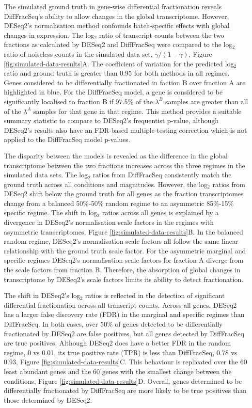 \documentclass[../main.tex]{subfiles}
\begin{document}
The simulated ground truth in gene-wise differential fractionation reveals DiffFracSeq's ability to allow changes in the global transcriptome.
However, DESeq2's normalisation method confounds batch-specific effects with global changes in expression.
The log$_2$ ratio of transcript counts between the two fractions as calculated by DESeq2 and DiffFracSeq were compared to the log$_2$ ratio of noiseless counts in the simulated data set, $\gamma/(1-\gamma)$, Figure \ref{fig:simulated-data-results}A.
The coefficient of variation for the predicted log$_2$ ratio and ground truth is greater than 0.95 for both methods in all regimes. 
Genes considered to be differentially fractionated in faction B over fraction A are highlighted in blue.
For the DiffFracSeq model, a gene is considered to be significantly localised to fraction B if 97.5\% of the $\lambda^{B}$ samples are greater than all of the $\lambda^{A}$ samples for that gene in that regime.
This method provides a suitable summary statistic to compare to DESeq2's frequentist p-value, although DESeq2's results also have an FDR-based multiple-testing correction which is not applied to the DiffFracSeq model p-values.

The disparity between the models is revealed as the difference in the global transcriptome between the two fractions increases across the three regimes in the simulated data sets.
The log$_2$ ratios from DiffFracSeq consistently match the ground truth across all conditions and magnitudes.
However, the log$_2$ ratios from DESeq2 shift below the ground truth for all genes as the fraction transcriptomes change from a balanced 50\%-50\% random regime to an asymmetric 85\%-15\% specific regime.
The shift in log$_2$ ratios across all genes is explained by a divergence in DESeq2's normalisation scale factors in the regimes with asymmetric transcriptomes, Figure \ref{fig:simulated-data-results}B.
In the balanced random regime, DESeq2's normalisation scale factors all follow the same linear relationship with the ground truth scale factor.
For the asymmetric marginal and specific regimes DESeq2's normalisation scale factors for fraction A diverge from the scale factors from fraction B.
Therefore, the absorption of global changes in transcriptome by DESeq2's scale factors limits its ability to detect fractionation.

The shift in DESeq2's log$_2$ ratios is reflected in the detection of significant differential fractionation across all transcript counts.
Across all genes, DESeq2 has a larger false discovery rate (FDR) in the marginal and specific regimes than DiffFracSeq.
In both cases, over 50\% of genes detected to be differentially fractionated by DESeq2 are false positives, but all genes detected by DiffFracSeq are true positives.
Although DESeq2 does have a better FDR in the random regime, 0 vs 0.01, its true positive rate (TPR) is less than DiffFracSeq, 0.78 vs 0.93, Figure \ref{fig:simulated-data-results}C.
This behaviour is replicated over the 60 least abundant genes and the 60 genes with the smallest change between the conditions, Figure \ref{fig:simulated-data-results}D.
Overall, genes determined to be differentially fractionated by DiffFracSeq are more likely to be true positives than those determined by DESeq2.
\end{document}
